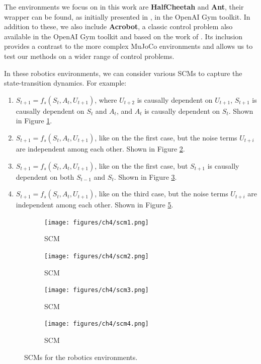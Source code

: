 The environments we focus on in this work are
\textbf{HalfCheetah} and \textbf{Ant},
their wrapper can be found, as initially
presented in \cite{brockman2016openaigym},
in the OpenAI Gym toolkit.
In addition to these, we also include \textbf{Acrobot},
a classic control problem also available in the OpenAI Gym
toolkit and based on the work of \cite{sutton1998}.
Its inclusion provides
a contrast to the more complex MuJoCo environments and
allows us to test our methods on a wider range of
control problems.

In these robotics environments, we can consider
various SCMs
to capture the state-transition dynamics. For example:
\begin{enumerate}
    \item $S_{t+1} = f_s(S_t, A_t, U_{t+1})$, where $U_{t+2}$
    is causally dependent on $U_{t+1}$, 
    $S_{t+1}$ is causally dependent on $S_t$ and $A_t$, and
    $A_t$ is causally dependent on $S_t$. Shown in Figure \ref{fig:scm1}.
    \item $S_{t+1} = f_s(S_t, A_t, U_{t+1})$, like on the
    the first case, but the noise terms $U_{t+i}$ are independent
    among each other. Shown in Figure \ref{fig:scm2}.
    \item $S_{t+1} = f_s(S_t, A_t, U_{t+1})$, like on the
    the first case, but $S_{t+1}$ is causally dependent on both $S_{t-1}$
    and $S_t$. Shown in Figure \ref{fig:scm3}.
    \item $S_{t+1} = f_s(S_t, A_t, U_{t+1})$, like on the
    third case, but the noise terms $U_{t+i}$ are independent
    among each other. Shown in Figure \ref{fig:scm4}.
\end{enumerate}
\begin{figure}
    \begin{subfigure}[t]{.4\textwidth}
        \centering
        \texttt{[image: figures/ch4/scm1.png]}
        \caption{ SCM}
        \label{fig:scm1}
    \end{subfigure}
    \hfill
    \begin{subfigure}[t]{.4\textwidth}
        \centering
        \texttt{[image: figures/ch4/scm2.png]}
        \caption{ SCM}
        \label{fig:scm2}
    \end{subfigure}
    \medskip
    \begin{subfigure}[t]{.4\textwidth}
        \centering
        \texttt{[image: figures/ch4/scm3.png]}
        \caption{ SCM}
        \label{fig:scm3}
    \end{subfigure}
    \hfill
    \begin{subfigure}[t]{.4\textwidth}
        \centering
        \texttt{[image: figures/ch4/scm4.png]}
        \caption{ SCM}
        \label{fig:scm4}
    \end{subfigure}
    \caption{SCMs for the robotics environments.}
\end{figure}
